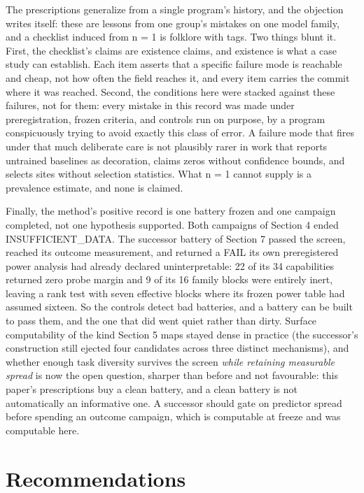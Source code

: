 The prescriptions generalize from a single program's history, and the
objection writes itself: these are lessons from one group's mistakes
on one model family, and a checklist induced from n = 1 is folklore
with tags. Two things blunt it. First, the checklist's claims are
existence claims, and existence is what a case study can establish.
Each item asserts that a specific failure mode is reachable and cheap,
not how often the field reaches it, and every item carries the commit
where it was reached. Second, the conditions here were stacked against
these failures, not for them: every mistake in this record was made
under preregistration, frozen criteria, and controls run on purpose,
by a program conspicuously trying to avoid exactly this class of
error. A failure mode that fires under that much deliberate care is
not plausibly rarer in work that reports untrained baselines as
decoration, claims zeros without confidence bounds, and selects sites
without selection statistics. What n = 1 cannot supply is a prevalence
estimate, and none is claimed.

Finally, the method's positive record is one battery frozen and one
campaign completed, not one hypothesis supported. Both campaigns of
Section 4 ended INSUFFICIENT\_DATA. The successor battery of Section 7
passed the screen, reached its outcome measurement, and returned a
FAIL its own preregistered power analysis had already declared
uninterpretable: 22 of its 34 capabilities returned zero probe margin
and 9 of its 16 family blocks were entirely inert, leaving a rank
test with seven effective blocks where its frozen power table had
assumed sixteen. So the controls detect bad batteries, and a battery
can be built to pass them, and the one that did went quiet rather
than dirty. Surface computability of the kind Section 5 maps stayed
dense in practice (the successor's construction still ejected four
candidates across three distinct mechanisms), and whether enough task
diversity survives the screen \emph{while retaining measurable spread} is
now the open question, sharper than before and not favourable: this
paper's prescriptions buy a clean battery, and a clean battery is not
automatically an informative one. A successor should gate on
predictor spread before spending an outcome campaign, which is
computable at freeze and was computable here.

\section{Recommendations}\label{recommendations}

